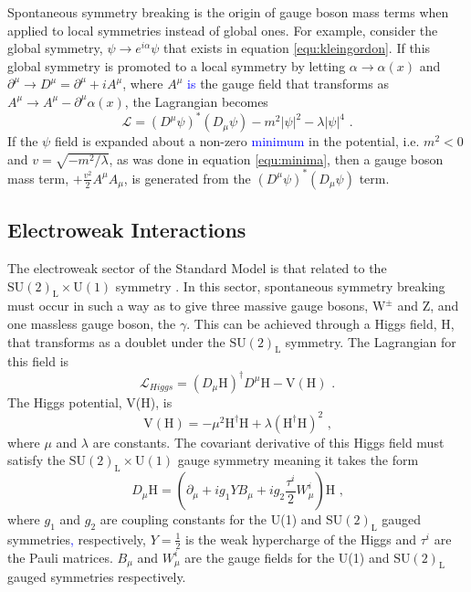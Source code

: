 Spontaneous symmetry breaking is the origin of gauge boson mass terms when applied to local symmetries instead of global ones.  For example, consider the global symmetry, $\psi \rightarrow e^{i\alpha} \psi$ that exists in equation \ref{equ:kleingordon}.  If this global symmetry is promoted to a local symmetry by letting $\alpha \rightarrow \alpha(x)$ and $\partial^{\mu} \rightarrow D^{\mu} = \partial^{\mu} + iA^{\mu}$, where $A^{\mu}$ \textcolor{blue}{is} the gauge field that transforms as $A^{\mu} \rightarrow A^{\mu} - \partial^{\mu}\alpha(x)$, the Lagrangian becomes
%
\begin{equation}
\mathcal{L} = (D^{\mu} \psi)^{*} (D_{\mu} \psi) - m^{2} |\psi|^{2} - \lambda |\psi|^{4} \text{ .}
\end{equation}
%
\noindent If the $\psi$ field is expanded about a non-zero \textcolor{blue}{minimum} in the potential, i.e. $m^{2} < 0$ and $v = \sqrt{-m^{2}/\lambda}$, as was done in equation \ref{equ:minima}, then a gauge boson mass term, $+\frac{v^{2}}{2} A^{\mu} A_{\mu}$, is generated from the $(D^{\mu} \psi)^{*} (D_{\mu} \psi)$ term.


\subsection{Electroweak Interactions}
\label{sec:ewint}
The electroweak sector of the Standard Model is that related to the $\text{SU}(2)_{\text{L}} \times \text{U}(1)$ symmetry \cite{Ellis:2013jnq}.  In this sector, spontaneous symmetry breaking must occur in such a way as to give three massive gauge bosons,  $\text{W}^{\pm}$ and Z, and one massless gauge boson, the $\gamma$.  This can be achieved through a Higgs field, H, that transforms as a doublet under the $\text{SU}(2)_{\text{L}}$ symmetry.  The Lagrangian for this field is
%
\begin{equation}
\mathcal{L}_{Higgs} = (D_{\mu}\text{H})^{\dagger}D^{\mu}\text{H} - \text{V}(\text{H}) \text{ .}
\end{equation}
%
\noindent The Higgs potential, V(H), is
%
\begin{equation}
\text{V}(\text{H}) = -\mu^{2}\text{H}^{\dagger}\text{H} + \lambda (\text{H}^{\dagger}\text{H})^{2} \text{ ,}
\end{equation}
%
\noindent where $\mu$ and $\lambda$ are constants.  The covariant derivative of this Higgs field must satisfy the $\text{SU}(2)_{\text{L}} \times \text{U}(1)$ gauge symmetry meaning it takes the form
%
\begin{equation}
D_{\mu} \text{H} = (\partial_{\mu} + ig_{1}YB_{\mu} + ig_{2}\frac{\tau^{i}}{2}W^{i}_{\mu})\text{H} \text{ ,}
\end{equation}
%
\noindent where $g_{1}$ and $g_{2}$ are coupling constants for the U(1) and $\text{SU}(2)_{\text{L}}$ gauged symmetries\textcolor{blue}{,} respectively, $Y = \frac{1}{2}$ is the weak hypercharge of the Higgs and $\tau^{i}$ are the Pauli matrices.  $B_{\mu}$ and $W^{i}_{\mu}$ are the gauge fields for the U(1) and $\text{SU}(2)_{\text{L}}$ gauged symmetries respectively.  

